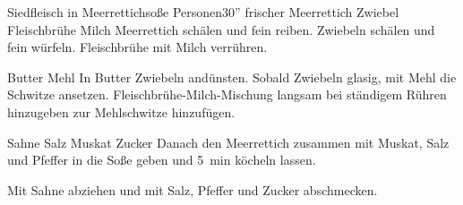 \begin{MyRecipe}{Siedfleisch in Meerrettichsoße}{ Personen}{30''}
	\ingredient[\Calc{10}{\x}]{\si{\gram}} {frischer Meerrettich}
	\ingredient[\Calc{1}{\x}]{} {Zwiebel}
	\ingredient[\Calc{0.3}{\x}]{\si{\liter}} {Fleischbrühe}
	\ingredient[\Calc{0.2}{\x}]{\si{\liter}} {Milch}
	Meerrettich schälen und fein reiben. Zwiebeln schälen und fein würfeln. Fleischbrühe mit Milch verrühren.\par\bigskip
	
	\ingredient[\Calc{30}{\x}]{\si{\gram}} {Butter}
	 {Mehl}
	In Butter Zwiebeln andünsten. Sobald Zwiebeln glasig, mit Mehl die Schwitze ansetzen. Fleischbrühe-Milch-Mischung langsam bei ständigem Rühren hinzugeben zur Mehlschwitze hinzufügen. \par\bigskip
	
	 {Sahne}
	\ingredient[]{} {Salz}
	\ingredient[]{} {Muskat}
	\ingredient[]{} {Zucker}
	Danach den Meerrettich zusammen mit Muskat, Salz und Pfeffer in die Soße geben und \SI{5}{\minute} köcheln lassen.\par\bigskip
	
	Mit Sahne abziehen und mit Salz, Pfeffer und Zucker abschmecken.\par\bigskip
	
	
	
	
	
\end{MyRecipe}